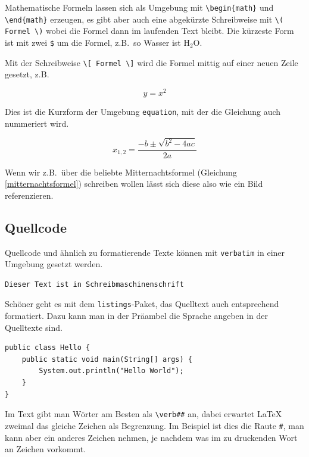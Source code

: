 Mathematische Formeln lassen sich als Umgebung mit \verb|\begin{math}| und \verb|\end{math}| erzeugen, es gibt aber auch eine abgekürzte Schreibweise mit \verb|\( Formel \)| wobei die Formel dann im laufenden Text bleibt. Die kürzeste Form ist mit zwei \verb|$| um die Formel, z.B.~so Wasser ist H$_2$O.

Mit der Schreibweise \verb|\[ Formel \]| wird die Formel mittig auf einer neuen Zeile gesetzt, z.B.

\[y = x^2 \]

Dies ist die Kurzform der Umgebung \verb|equation|, mit der die Gleichung auch nummeriert wird. 

\begin{equation}
    x_{1,2} = \frac{-b\pm\sqrt{b^2-4ac}}{2a}
    \label{mitternachtsformel}
\end{equation}

Wenn wir z.B.~über die beliebte Mitternachtsformel (Gleichung \ref{mitternachtsformel}) schreiben wollen lässt sich diese also wie ein Bild referenzieren.



\subsection{Quellcode}

Quellcode und ähnlich zu formatierende Texte können mit \verb|verbatim| in einer Umgebung gesetzt werden.

\begin{verbatim}
Dieser Text ist in Schreibmaschinenschrift
\end{verbatim}

Schöner geht es mit dem \verb|listings|-Paket, das Quelltext auch entsprechend formatiert. Dazu kann man in der Präambel die Sprache angeben in der Quelltexte sind.

\begin{lstlisting}
public class Hello {
    public static void main(String[] args) {
        System.out.println("Hello World");
    }
}
\end{lstlisting}

Im Text gibt man Wörter am Besten als \verb|\verb##| an, dabei erwartet \LaTeX{} zweimal das gleiche Zeichen als Begrenzung. Im Beispiel ist dies die Raute \verb|#|, man kann aber ein anderes Zeichen nehmen, je nachdem was im zu druckenden Wort an Zeichen vorkommt.



